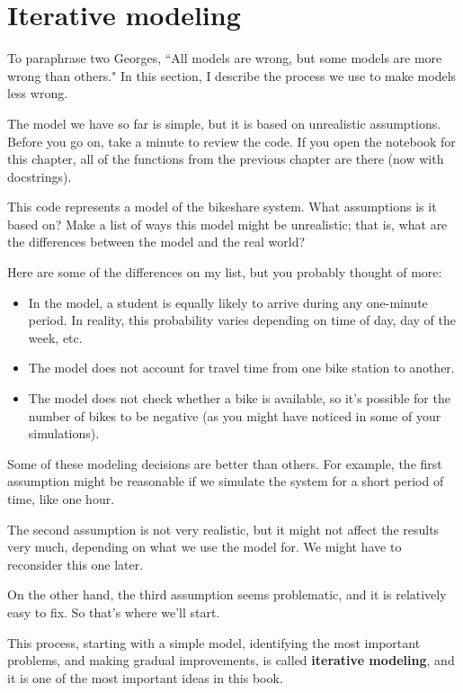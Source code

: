 \documentclass[12pt]{book}
\theoremstyle{exercise}
\begin{document}
\section{Iterative modeling}

To paraphrase two Georges, ``All models are wrong, but some models are more wrong than others."  In this section, I describe the process we use to make models less wrong.

The model we have so far is simple, but it is based on unrealistic assumptions.  Before you go on, take a minute to review the code.  If you open the notebook for this chapter, all of the functions from the previous chapter are there (now with docstrings).

This code represents a model of the bikeshare system.  What assumptions is it based on?  Make a list of ways this model might be unrealistic; that is, what are the differences between the model and the real world?

Here are some of the differences on my list, but you probably thought of more:

\begin{itemize}

\item In the model, a student is equally likely to arrive during any one-minute period.  In reality, this probability varies depending on time of day, day of the week, etc.

\item The model does not account for travel time from one bike station to another.

\item The model does not check whether a bike is available, so it's possible for the number of bikes to be negative (as you might have noticed in some of your simulations).

\end{itemize}

Some of these modeling decisions are better than others.  For example, the first assumption might be reasonable if we simulate the system for a short period of time, like one hour.

The second assumption is not very realistic, but it might not affect the results very much, depending on what we use the model for.  We might have to reconsider this one later.

On the other hand, the third assumption seems problematic, and it is relatively easy to fix.  So that's where we'll start.

This process, starting with a simple model, identifying the most important problems, and making gradual improvements, is called {\bf iterative modeling}, and it is one of the most important ideas in this book.
\end{document}
